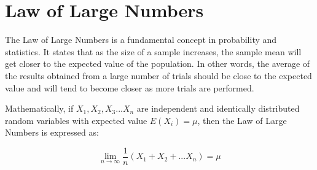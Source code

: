 \section{Law of Large Numbers}
\label{appendix:large_numbers}

The Law of Large Numbers is a fundamental concept in probability and statistics. It states that as the size of a sample increases, the sample mean will get closer to the expected value of the population. In other words, the average of the results obtained from a large number of trials should be close to the expected value and will tend to become closer as more trials are performed.

Mathematically, if $X_1, X_2, X_3...X_n$ are independent and identically distributed random variables with expected value $E(X_i)=\mu$, then the Law of Large Numbers is expressed as:

$$\lim_{n\to\infty}\frac{1}{n}(X_1+X_2+...X_n)=\mu$$
